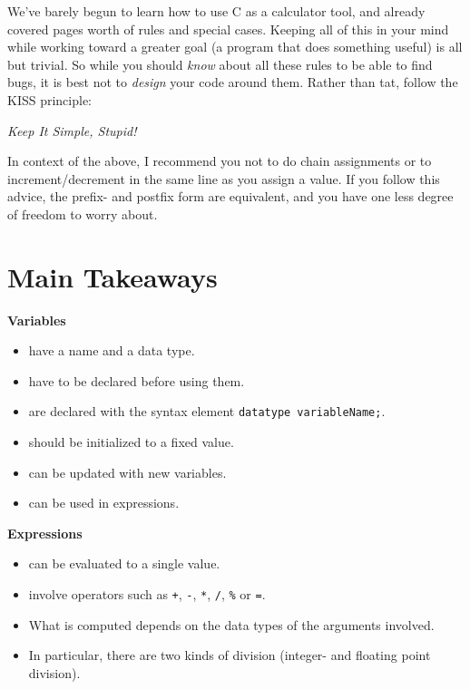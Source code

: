 {{{{\begin{hintbox}
We've barely begun to learn how to use C as a calculator tool, and already covered pages worth of rules and special cases. Keeping all of this in your mind while working toward a greater goal (a program that does something useful) is all but trivial. So while you should \emph{know} about all these rules to be able to find bugs, it is best not to \emph{design} your code around them. Rather than tat, follow the KISS principle:

\begin{center}
	\emph{Keep It Simple, Stupid!}
\end{center}

In context of the above, I recommend you not to do chain assignments or to increment/decrement in the same line as you assign a value. If you follow this advice, the prefix- and postfix form are equivalent, and you have one less degree of freedom to worry about.
\end{hintbox}


\section{Main Takeaways}
\begin{defbox}
\textbf{Variables}
\begin{itemize}
\item have a name and a data type.
\item have to be declared before using them.
\item are declared with the syntax element \texttt{datatype variableName;}.
\item should be initialized to a fixed value.
\item can be updated with new variables.
\item can be used in expressions.
\end{itemize}

\textbf{Expressions}
\begin{itemize}
\item can be evaluated to a single value.
\item involve operators such as \texttt{+}, \texttt{-}, \texttt{*}, \texttt{/}, \texttt{\%} or \texttt{=}.
\item What is computed depends on the data types of the arguments involved.
\item In particular, there are two kinds of division (integer- and floating point division).
\end{itemize}


\end{defbox}}}}}
